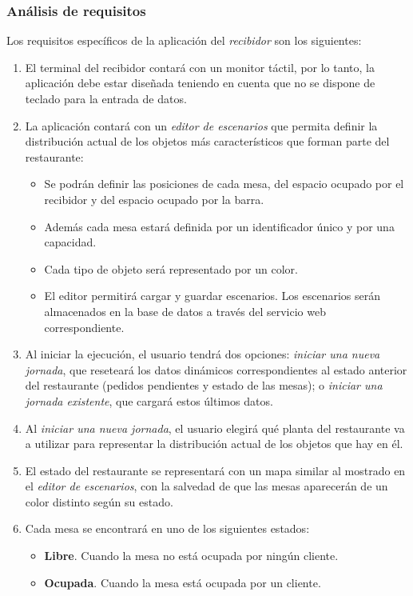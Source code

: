 \subsubsection{Análisis de requisitos}
Los requisitos específicos de la aplicación del \emph{recibidor} son los
siguientes:
\begin{enumerate}
\item El terminal del recibidor contará con un monitor táctil,
por lo tanto, la aplicación debe estar diseñada teniendo en cuenta que no se
dispone de teclado para la entrada de datos.
\item La aplicación contará con un \emph{editor de escenarios} que permita
definir la distribución actual de los objetos más característicos que forman
parte del restaurante:
  \begin{itemize}
  \item Se podrán definir las posiciones de cada mesa, del espacio ocupado por
  el recibidor y del espacio ocupado por la barra.
  \item Además cada mesa estará definida por un identificador único y
  por una capacidad.
  \item Cada tipo de objeto será representado por un color.
  \item El editor permitirá cargar y guardar escenarios. Los escenarios serán
  almacenados en la base de datos a través del servicio web correspondiente.
  \end{itemize}
\item Al iniciar la ejecución, el usuario tendrá dos opciones:
\emph{iniciar una nueva jornada}, que reseteará los datos dinámicos
correspondientes al estado anterior del restaurante (pedidos pendientes y
estado de las mesas); o \emph{iniciar una jornada existente}, que cargará
estos últimos datos.
\item Al \emph{iniciar una nueva jornada}, el usuario elegirá qué planta del
restaurante va a utilizar para representar la distribución actual de los
objetos que hay en él.
\item El estado del restaurante se representará con un mapa similar al mostrado
en el \emph{editor de escenarios}, con la salvedad de que las mesas aparecerán
de un color distinto según su estado.
\item Cada mesa se encontrará en uno de los siguientes estados:
  \begin{itemize}
  \item \textbf{Libre}. Cuando la mesa no está ocupada por ningún cliente.
  \item \textbf{Ocupada}. Cuando la mesa está ocupada por un cliente.

\end{itemize}
\end{enumerate}

